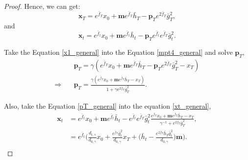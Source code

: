 \begin{proof}
Hence, we can get:
\begin{equation}\label{x1_general}
\mathbf{x}_T = e^{\bar{f}_{T}}x_0 + \mathbf{m} e^{\bar{f}_{T}} \bar{h}_{T} - \mathbf{p}_{T} e^{2\bar{f}_{T}} \bar{g}^2_{T},
\end{equation}
and
\begin{equation}\label{xt_general}
\mathbf{x}_t = e^{\bar{f}_{t}}x_0 + \mathbf{m} e^{\bar{f}_{t}} \bar{h}_{t} - \mathbf{p}_{T} e^{\bar{f}_{t}} e^{\bar{f}_{T}} \bar{g}^2_{t}.
\end{equation}

Take the Equation \eqref{x1_general} into the Equation \eqref{mpt4_general} and solve $\mathbf{p}_{T}$, 
\begin{align}\label{pT_general}
&\mathbf{p}_{T} = \gamma \left( e^{\bar{f}_{T}}x_0 + \mathbf{m} e^{\bar{f}_{T}} \bar{h}_{T} - \mathbf{p}_{T} e^{2\bar{f}_{T}} \bar{g}^2_{T} - x_{T} \right) \\
\Rightarrow \quad & \mathbf{p}_{T} = \frac{\gamma \left( e^{\bar{f}_{T}}x_0 + \mathbf{m} e^{\bar{f}_{T}} \bar{h}_{T} - x_{T} \right)}{1 + \gamma e^{2\bar{f}_{T}} \bar{g}^2_{T}}.
\end{align}


Also, take the Equation \eqref{pT_general} into the equation \eqref{xt_general}, 
\begin{equation}\label{36}
\begin{split}
    \mathbf{x}_t 
    &= e^{\bar{f}_{t}}x_0 + \mathbf{m} e^{\bar{f}_{t}} \bar{h}_{t} - e^{\bar{f}_{t}} e^{\bar{f}_{T}} \bar{g}^2_{t} \frac{e^{\bar{f}_{T}}x_0 + \mathbf{m} e^{\bar{f}_{T}} \bar{h}_{T} - x_{T}}{\gamma^{-1} + e^{2\bar{f}_{T}} \bar{g}^2_{T}},  \\
    &= e^{\bar{f}_{t}} \Bigg(\frac{d_{t, \gamma}}{d_{0, \gamma}} x_0 + \frac{e^{\bar{f}_{T}} \bar{g}^2_{t}}{d_{0, \gamma}} x_T + \Big(\bar{h}_{t} - \frac{e^{2\bar{f}_{T}} \bar{h}_{T} \bar{g}^2_{t}}{d_{0, \gamma}}\Big) \mathbf{m}\Bigg). \\
\end{split}
\end{equation}



\end{proof}
